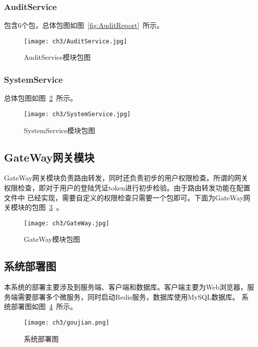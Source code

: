 \subsubsection{AuditService}
包含6个包，总体包图如图~\ref{fig:AuditReport}~所示。
\begin{figure}[htbp]
    \centering
    \texttt{[image: ch3/AuditService.jpg]}
    \caption{AuditService模块包图}\label{fig:AuditService}
    \vspace{\baselineskip} %
\end{figure}

\subsubsection{SystemService}
总体包图如图~\ref{fig:SystemService}~所示。
\begin{figure}[htbp]
    \centering
    \texttt{[image: ch3/SystemService.jpg]}
    \caption{SystemService模块包图}\label{fig:SystemService}
    \vspace{\baselineskip} %
\end{figure}


\subsection{GateWay网关模块}
GateWay网关模块负责路由转发，同时还负责初步的用户权限检查。所谓的网关权限检查，即对于用户的登陆凭证token进行初步检验。由于路由转发功能在配置文件中
已经实现，需要自定义的权限检查只需要一个包即可。下面为GateWay网关模块的包图~\ref{fig:GateWay}~。
\begin{figure}[htbp]
    \centering
    \texttt{[image: ch3/GateWay.jpg]}
    \caption{GateWay模块包图}\label{fig:GateWay}
    \vspace{\baselineskip} %
\end{figure}

\subsection{系统部署图}
本系统的部署主要涉及到服务端、客户端和数据库。客户端主要为Web浏览器，服务端需要部署多个微服务，同时启动Redis服务，数据库使用MySQL数据库。
系统部署图如图~\ref{fig:goujian}~所示。
\begin{figure}[htbp]
    \centering
    \texttt{[image: ch3/goujian.png]}
    \caption{系统部署图}\label{fig:goujian}
    \vspace{\baselineskip} %
\end{figure}
